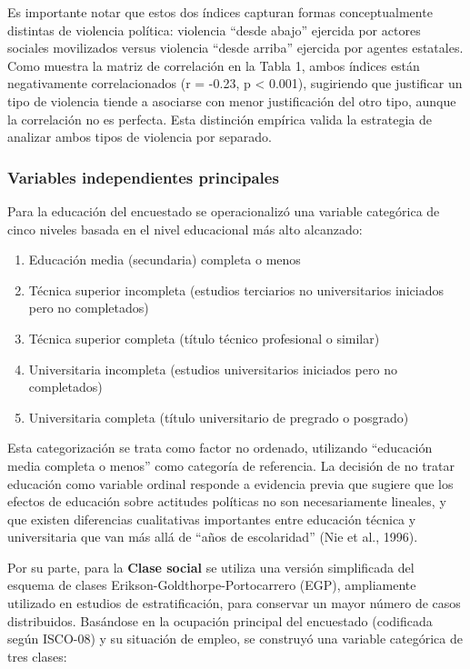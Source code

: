 \documentclass[
  13pt,
]{article}
\providecommand{\tightlist}{%
  \setlength{\itemsep}{0pt}\setlength{\parskip}{0pt}}
\begin{document}
Es importante notar que estos dos índices capturan formas
conceptualmente distintas de violencia política: violencia ``desde
abajo'' ejercida por actores sociales movilizados versus violencia
``desde arriba'' ejercida por agentes estatales. Como muestra la matriz
de correlación en la Tabla 1, ambos índices están negativamente
correlacionados (r = -0.23, p \textless{} 0.001), sugiriendo que
justificar un tipo de violencia tiende a asociarse con menor
justificación del otro tipo, aunque la correlación no es perfecta. Esta
distinción empírica valida la estrategia de analizar ambos tipos de
violencia por separado.

\subsubsection{Variables independientes
principales}\label{variables-independientes-principales}

Para la educación del encuestado se operacionalizó una variable
categórica de cinco niveles basada en el nivel educacional más alto
alcanzado:

\begin{enumerate}
\def\labelenumi{\arabic{enumi}.}
\tightlist
\item
  Educación media (secundaria) completa o menos
\item
  Técnica superior incompleta (estudios terciarios no universitarios
  iniciados pero no completados)
\item
  Técnica superior completa (título técnico profesional o similar)
\item
  Universitaria incompleta (estudios universitarios iniciados pero no
  completados)
\item
  Universitaria completa (título universitario de pregrado o posgrado)
\end{enumerate}

Esta categorización se trata como factor no ordenado, utilizando
``educación media completa o menos'' como categoría de referencia. La
decisión de no tratar educación como variable ordinal responde a
evidencia previa que sugiere que los efectos de educación sobre
actitudes políticas no son necesariamente lineales, y que existen
diferencias cualitativas importantes entre educación técnica y
universitaria que van más allá de ``años de escolaridad'' (Nie et al.,
1996).

Por su parte, para la \textbf{Clase social} se utiliza una versión
simplificada del esquema de clases Erikson-Goldthorpe-Portocarrero
(EGP), ampliamente utilizado en estudios de estratificación, para
conservar un mayor número de casos distribuidos. Basándose en la
ocupación principal del encuestado (codificada según ISCO-08) y su
situación de empleo, se construyó una variable categórica de tres
clases:
\end{document}
